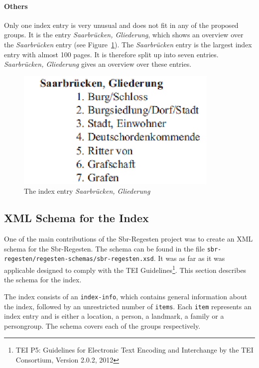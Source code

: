 \paragraph{Others}
\label{sec:other-index-entry}
Only one index entry is very unusual and does not fit in any of the proposed groups. It is the entry \textit{Saarbrücken, Gliederung}, which shows an overview over the \textit{Saarbrücken} entry (see Figure~\ref{fig:sb-gliederung}). The \textit{Saarbrücken} entry is the largest index entry with almost 100 pages. It is therefore split up into seven entries. \textit{Saarbrücken, Gliederung} gives an overview over these entries.

\begin{figure}[h]
  \centering
  \includegraphics[scale=0.6]{img/sb-gliederung}
  \caption{The index entry \textit{Saarbrücken, Gliederung}}
  \label{fig:sb-gliederung}
\end{figure}


\subsection{XML Schema for the Index}
\label{sec:index-schema}
One of the main contributions of the Sbr-Regesten project was to create an XML schema for the Sbr-Regesten. The schema can be found in the file \texttt{sbr-regesten/regesten-schemas/sbr-regesten.xsd}.
It was as far as it was applicable designed to comply with the TEI Guidelines\footnote{TEI P5: Guidelines for Electronic Text Encoding and Interchange by the TEI Consortium, Version 2.0.2, 2012}. This section describes the schema for the index.

The index consists of an \texttt{index-info}, which contains general information about the index, followed by an unrestricted number of \texttt{items}. Each \texttt{item} represents an index entry and is either a location, a person, a landmark, a family or a persongroup. The schema covers each of the groups respectively.

